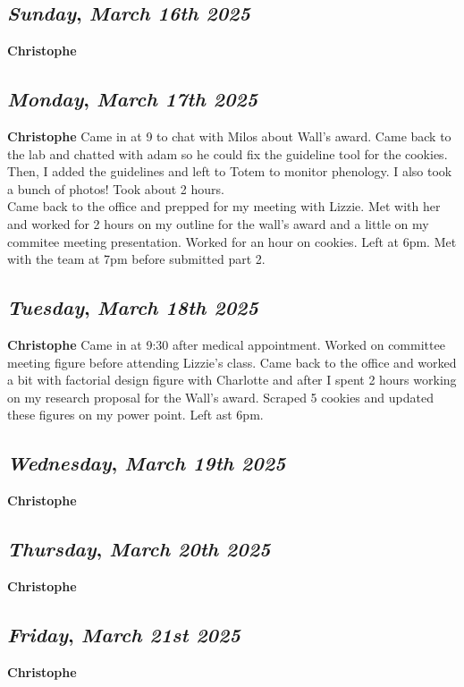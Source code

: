 \def\day{\textit{March 16th 2025}}
\def\weekday{\textit{Sunday}}
\subsection*{\weekday, \day}
\textbf {Christophe}

\def\day{\textit{March 17th 2025}}
\def\weekday{\textit{Monday}}
\subsection*{\weekday, \day}
\textbf {Christophe}
Came in at 9 to chat with Milos about Wall's award. Came back to the lab and chatted with adam so he could fix the guideline tool for the cookies. Then, I added the guidelines and left to Totem to monitor phenology. I also took a bunch of photos! Took about 2 hours. \\
Came back to the office and prepped for my meeting with Lizzie. Met with her and worked for 2 hours on my outline for the wall's award and a little on my commitee meeting presentation. Worked for an hour on cookies. Left at 6pm. Met with the team at 7pm before submitted part 2. 

\def\day{\textit{March 18th 2025}}
\def\weekday{\textit{Tuesday}}
\subsection*{\weekday, \day}
\textbf {Christophe}
Came in at 9:30 after medical appointment. Worked on committee meeting figure before attending Lizzie's class. Came back to the office and worked a bit with factorial design figure with Charlotte and after I spent 2 hours working on my research proposal for the Wall's award. Scraped 5 cookies and updated these figures on my power point. Left ast 6pm. 
\def\day{\textit{March 19th 2025}}
\def\weekday{\textit{Wednesday}}
\subsection*{\weekday, \day}
\textbf {Christophe}

\def\day{\textit{March 20th 2025}}
\def\weekday{\textit{Thursday}}
\subsection*{\weekday, \day}
\textbf {Christophe}

\def\day{\textit{March 21st 2025}}
\def\weekday{\textit{Friday}}
\subsection*{\weekday, \day}
\textbf {Christophe}

